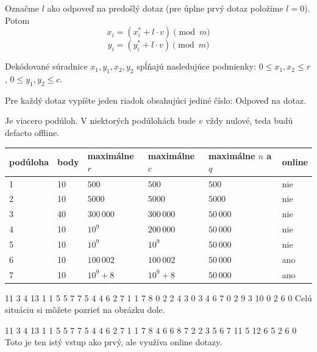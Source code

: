 Označme $l$ ako odpoveď na predošlý dotaz (pre úplne prvý dotaz položíme $l=0$). Potom
$$x_i = (x_i^* + l \cdot v) \pmod m$$
$$y_i = (y_i^* + l \cdot v) \pmod m$$

Dekódované súradnice $x_1, y_1, x_2, y_2$ spĺňajú nasledujúce podmienky:
$0 \leq x_1, x_2 \leq r$, $0 \leq y_1, y_2 \leq c$. 


Pre každý dotaz vypíšte jeden riadok obsahujúci jediné číslo: Odpoveď na dotaz.


Je viacero podúloh. V niektorých podúlohách bude $v$ vždy nulové,
teda budú defacto offline.

\bigskip

\begin{center}
\begin{tabular}{|l|l|l|l|l|l|}
\hline
podúloha& body   & maximálne $r$& maximálne $c$ & maximálne $n$ a $q$ & online    \\ \hline
1       & 10     & $500$        & $500$         & $500$     & nie        \\ \hline
2       & 10     & $5000$       & $5000$        & $5000$    & nie        \\ \hline
3       & 40     & $300\,000$   & $300\,000$    & $50\,000$ & nie        \\ \hline
4       & 10     & $10^9$       & $200\,000$    & $50\,000$ & nie        \\ \hline
5       & 10     & $10^9$       & $10^9$        & $50\,000$ & nie        \\ \hline
6       & 10     & $100\,002$   & $100\,002$    & $50\,000$ & ano       \\ \hline
7       & 10     & $10^9 + 8$   & $10^9 + 8$    & $50\,000$ & ano       \\ \hline
\end{tabular}
\end{center}



 11 3 4 13
1 1 5 5
7 7 5 4
4 6 2 7
1 1 7 8 0
2 2 4 3 0
3 4 6 7 0
2 9 3 10 0
2
6
0
\sampleCOMMENT
Celú situáciu si môžete pozrieť na obrázku dole.
\sampleEND
{}

 11 3 4 13
1 1 5 5
7 7 5 4
4 6 2 7
1 1 7 8 4
6 6 8 7 2
2 3 5 6 7
11 5 12 6 5
2
6
0
\sampleCOMMENT
Toto je ten istý vstup ako prvý, ale využíva online dotazy.
\sampleEND


